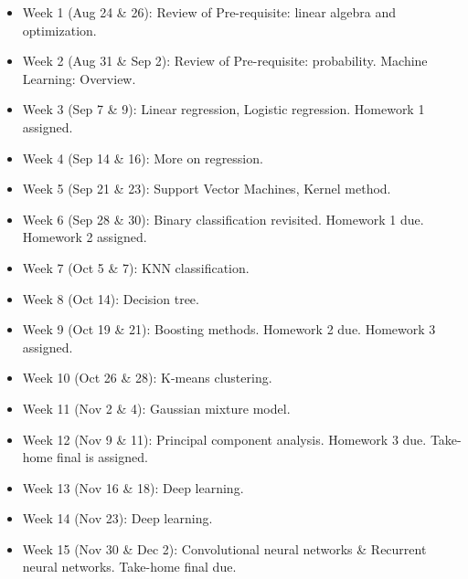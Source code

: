 \documentclass[a4paper,10pt]{article}
\begin{document}
\begin{itemize}
\item Week 1 (Aug 24 \& 26): Review of Pre-requisite: linear algebra and optimization. 

\item Week 2 (Aug 31 \& Sep 2): Review of Pre-requisite: probability. Machine Learning: Overview.

\item Week 3 (Sep 7 \& 9): Linear regression, Logistic regression. Homework 1 assigned. 

\item Week 4 (Sep 14 \& 16): More on regression.

\item Week 5 (Sep 21 \& 23): Support Vector Machines, Kernel method. 

\item Week 6 (Sep 28 \& 30): Binary classification revisited. Homework 1 due. Homework 2 assigned.  

\item Week 7 (Oct 5 \& 7): KNN classification.  

\item Week 8 (Oct 14): Decision tree.  

\item Week 9 (Oct 19 \& 21): Boosting methods. Homework 2 due. Homework 3 assigned.   

\item Week 10 (Oct 26 \& 28): K-means clustering.

\item Week 11 (Nov 2 \& 4): Gaussian mixture model.

\item Week 12 (Nov 9 \& 11): Principal component analysis.  Homework 3 due. Take-home final is assigned. 

\item Week 13 (Nov 16 \& 18):  Deep learning. 

\item Week 14 (Nov 23): Deep learning. 

\item Week 15 (Nov 30 \& Dec 2): Convolutional neural networks \& Recurrent neural networks. Take-home final due.
 
\end{itemize}
\end{document}

